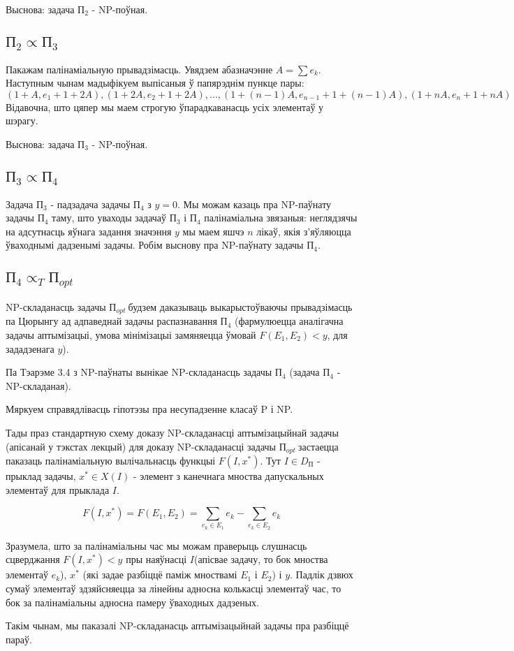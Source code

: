 \documentclass{article}
\newcommand{\opt}{${\text{П}}_{opt}\ $}
\begin{document}
Выснова: задача ${\text{П}}_{2}$ - NP-поўная.

\subsection*{${\text{П}}_{2} \propto {\text{П}}_{3}$}

Пакажам палінаміальную прывадзімасць. Увядзем абазначэнне $A = \sum{e_k}$.
Наступным чынам мадыфікуем выпісаныя ў папярэднім пункце пары:
\[
    (1+A, e_1+1+2A), (1+2A, e_2+1+2A), ... , (1+(n-1)A, e_{n-1}+1+(n-1)A), (1+nA, e_n+1+nA)
\]
Відавочна, што цяпер мы маем строгую ўпарадкаванасць усіх элементаў у шэрагу.

Выснова: задача ${\text{П}}_{3}$ - NP-поўная.

\subsection*{${\text{П}}_{3} \propto {\text{П}}_{4}$}

Задача ${\text{П}}_{3}$ - падзадача задачы ${\text{П}}_{4}$ з $y = 0$. Мы можам
казаць пра NP-паўнату задачы ${\text{П}}_{4}$ таму, што уваходы задачаў ${\text{П}}_{3}$
і ${\text{П}}_{4}$ палінаміальна звязаныя: неглядзячы на адсутнасць яўнага
задання значэння $y$ мы маем яшчэ $n$ лікаў, якія з'яўляюцца ўваходнымі дадзенымі
задачы. Робім выснову пра NP-паўнату задачы ${\text{П}}_{4}$.

\subsection*{${\text{П}}_{4} \propto_{T} {\text{П}}_{opt}$}

NP-складанасць задачы \opt будзем даказываць выкарыстоўваючы прывадзімасць па
Цюрынгу ад адпаведнай задачы распазнавання ${\text{П}}_{4}$
(фармулюецца аналігачна задачы аптымізацыі,
умова мінімізацыі замяняецца ўмовай $F(E_1, E_2) < y$, для зададзенага $y$).

Па Тэарэме 3.4 з NP-паўнаты вынікае NP-складанасць задачы ${\text{П}}_{4}$
(задача ${\text{П}}_{4}$ - NP-складаная).

Мяркуем справядлівасць гіпотэзы пра несупадзенне класаў P і NP.

Тады праз стандартную схему доказу NP-складанасці аптымізацыйнай задачы
(апісанай у тэкстах лекцый) для доказу NP-складанасці задачы \opt застаецца
паказаць палінаміальную вылічальнасць функцыі $F(I, x^{*})$. Тут $I \in D_{\text{П}}$ -
прыклад задачы, $x^{*} \in X(I)$ - элемент з канечнага мноства дапускальных
элементаў для прыклада $I$.

\[
F(I, x^{*}) = F(E_1, E_2) = \sum_{e_k \in E_1}{e_k} - \sum_{e_k \in E_2}{e_k}
\]

Зразумела, што за палінаміальны час мы можам праверыць слушнасць сцверджання
$F(I, x^{*}) < y$ пры наяўнасці $I$(апісвае задачу, то бок мноства элементаў
$e_k$), $x^{*}$ (які задае разбіццё паміж мноствамі $E_1$ і $E_2$) і $y$. Падлік
дзвюх сумаў элементаў здзяйсняецца за лінейны адносна колькасці элементаў час,
то бок за палінаміальны адносна памеру ўваходных дадзеных.

Такім чынам, мы паказалі NP-складанасць аптымізацыйнай задачы пра разбіццё параў.
\end{document}
